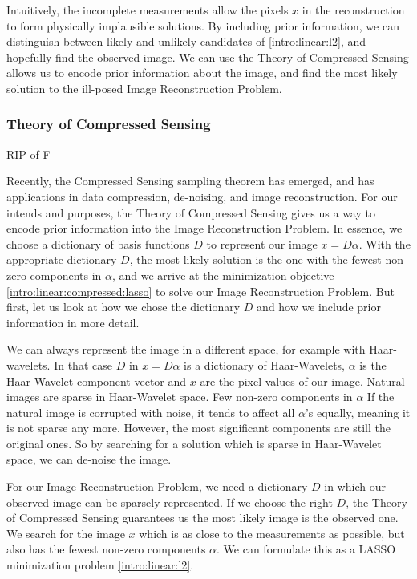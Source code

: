 Intuitively, the incomplete measurements allow the pixels $x$ in the reconstruction to form physically implausible solutions. By including prior information, we can distinguish between likely and unlikely candidates of \eqref{intro:linear:l2}, and hopefully find the observed image. We can use the Theory of Compressed Sensing allows us to encode prior information about the image, and find the most likely solution to the ill-posed Image Reconstruction Problem.

\subsubsection{Theory of Compressed Sensing}
RIP of F

Recently, the Compressed Sensing sampling theorem has emerged\cite{candes2006robust, donoho2006compressed}, and has applications in data compression, de-noising\cite{zhu2009new}, and image reconstruction. For our intends and purposes, the Theory of Compressed Sensing gives us a way to encode prior information into the Image Reconstruction Problem. In essence, we choose a dictionary of basis functions $D$ to represent our image $x = D\alpha$. With the appropriate dictionary $D$, the most likely solution is the one with the fewest non-zero components in $\alpha$, and we arrive at the minimization objective \eqref{intro:linear:compressed:lasso} to solve our Image Reconstruction Problem. But first, let us look at how we chose the dictionary $D$ and how we include prior information in more detail.

We can always represent the image in a different space, for example with Haar-wavelets. In that case $D$ in $x = D\alpha$ is a dictionary of Haar-Wavelets, $\alpha$ is the Haar-Wavelet component vector and $x$ are the pixel values of our image. 
Natural images are sparse in Haar-Wavelet space. Few non-zero components in $\alpha$
If the natural image is corrupted with noise, it tends to affect all $\alpha$'s equally, meaning it is not sparse any more. However, the most significant components are still the original ones. So by searching for a solution which is sparse in Haar-Wavelet space, we can de-noise the image.

For our Image Reconstruction Problem, we need a dictionary $D$ in which our observed image can be sparsely represented.
If we choose the right $D$, the Theory of Compressed Sensing guarantees us the most likely image is the observed one.
We search for the image $x$ which is as close to the measurements as possible, but also has the fewest non-zero components $\alpha$. We can formulate this as a LASSO minimization problem \eqref{intro:linear:l2}.

